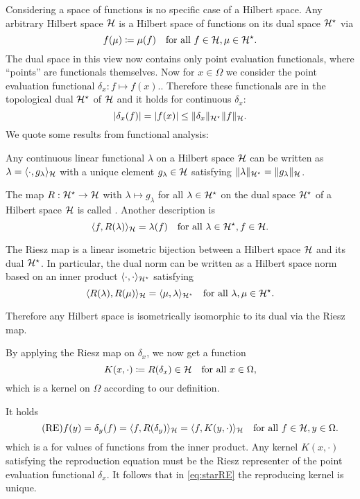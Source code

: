 \documentclass[../lecture-notes.tex]{subfiles}
\begin{document}
Considering a space of functions is no specific case of a Hilbert space. Any arbitrary Hilbert space $\mathcal{H}$ is a Hilbert space of functions on its dual space $\mathcal{H}^{\star}$ via
\[
	f(\mu) \coloneqq \mu(f) \quad \text{for all } f \in \mathcal{H}, \mu \in \mathcal{H}^{\star}.
\] 
The dual space in this view now contains only point evaluation functionals, where ``points'' are functionals themselves.
Now for $x \in \Omega$ we consider the point evaluation functional $\delta_x : f \mapsto f(x)$..
Therefore these functionals are in the topological dual $\mathcal{H}^{\star}$ of $\mathcal{H}$ and it holds for continuous $\delta_x$:
\[
	|\delta_x(f)| = |f(x)| \leq \| \delta_x \|_{\mathcal{H}^{\star}} \| f \|_{\mathcal{H}}.
\]
We quote some results from functional analysis:
\begin{theorem} %
\label{thm:3}
Any continuous linear functional $\lambda$ on a Hilbert space $\mathcal{H}$ can be written as $\lambda = \langle \cdot, g_\lambda \rangle_{\mathcal{H}}$ with a unique element $g_\lambda \in \mathcal{H}$ satisfying $\| \lambda \|_{\mathcal{H}^{\star}} = \| g_\lambda \|_{\mathcal{H}}$.
\end{theorem}
\begin{definition} %
\label{thm:4}
The  map $R : \mathcal{H}^{\star} \to \mathcal{H}$ with $\lambda \mapsto g_\lambda$ for all $\lambda \in \mathcal{H}^{\star}$ on the dual space $\mathcal{H}^{\star}$ of a Hilbert space $\mathcal{H}$ is called . Another description is
\[
	\langle f, R(\lambda) \rangle_{\mathcal{H}} = \lambda(f) \quad \text{for all } \lambda \in \mathcal{H}^{\star}, f \in \mathcal{H}.
\]
\end{definition}
\begin{theorem} %
\label{thm:5}
The Riesz map is a linear isometric bijection between a Hilbert space $\mathcal{H}$ and its dual $\mathcal{H}^{\star}$. In particular, the dual norm can be written as a Hilbert space norm based on an inner product $\langle \cdot, \cdot \rangle_{\mathcal{H}^{\star}}$ satisfying
\[
	\langle R(\lambda), R(\mu) \rangle_{\mathcal{H}} = \langle \mu, \lambda \rangle_{\mathcal{H}^{\star}} \quad \text{for all } \lambda, \mu \in \mathcal{H}^{\star}.
\]
\end{theorem}
Therefore any Hilbert space is isometrically isomorphic to its dual via the Riesz map.

By applying the Riesz map on $\delta_x$, we now get a function
\[
	K(x, \cdot) \coloneqq R(\delta_x) \in \mathcal{H} \quad \text{for all } x \in \Omega,
\]
which is a kernel on $\Omega$ according to our definition.

It holds
\begin{equation} %
\label{eq:starRE}
\ifx\orinaltags\undefined
	\tag{RE}
\else
	\opttag{$\star$RE}
\fi
	f(y) = \delta_y(f) = \langle f, R(\delta_y) \rangle_{\spH} = \langle f, K(y, \cdot) \rangle_{\spH} \quad \text{for all } f \in \spH, y \in \Omega.
\end{equation}
which is a  for values of functions from the inner product.
Any kernel $K(x, \cdot)$ satisfying the reproduction equation must be the Riesz representer of the point evaluation functional $\delta_x$. It follows that in \cref{eq:starRE} the reproducing kernel is unique.
\end{document}
